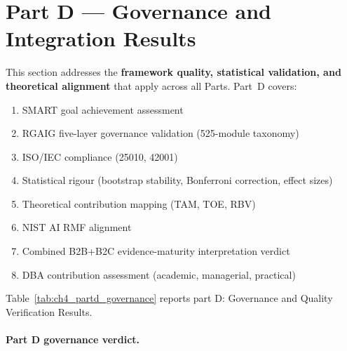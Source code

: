 

\section{Part D --- Governance and Integration Results}
\label{sec:ch4_part_d}

This section addresses the \textbf{framework quality, statistical validation, and theoretical alignment} that apply across all Parts. Part~D covers:
\begin{enumerate}[leftmargin=*, itemsep=1pt, label=(\arabic*)]
    \item SMART goal achievement assessment
    \item RGAIG five-layer governance validation (525-module taxonomy)
    \item ISO/IEC compliance (25010, 42001)
    \item Statistical rigour (bootstrap stability, Bonferroni correction, effect sizes)
    \item Theoretical contribution mapping (TAM, TOE, RBV)
    \item NIST AI RMF alignment
    \item Combined B2B+B2C evidence-maturity interpretation verdict
    \item DBA contribution assessment (academic, managerial, practical)
\end{enumerate}

\noindent Table~\ref{tab:ch4_partd_governance} reports part D: Governance and Quality Verification Results.

\paragraph{Part D governance verdict.}




